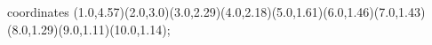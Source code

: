 					coordinates { (1.0,4.57)(2.0,3.0)(3.0,2.29)(4.0,2.18)(5.0,1.61)(6.0,1.46)(7.0,1.43)(8.0,1.29)(9.0,1.11)(10.0,1.14)};